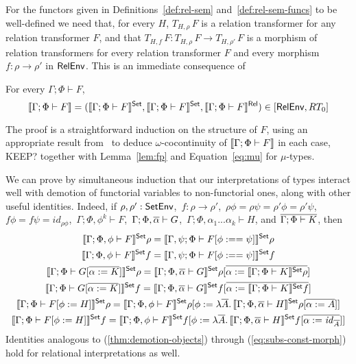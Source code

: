\documentclass{lmcs}
\theoremstyle{plain}\newtheorem{satz}[thm]{Satz}
\renewcommand{\id}{\mathit{id}}
\begin{document}
For the functors given in Definitions~\ref{def:rel-sem}
and~\ref{def:rel-sem-funcs} to be well-defined we need that, for every
$H$, $T_{H,\rho}\,F$ is a relation transformer for any relation
transformer $F$, and that $T_{H,f}\, F : T_{H,\rho}\, F \to
T_{H,\rho'}\, F$ is a morphism of relation transformers for every
relation transformer $F$ and every morphism $f : \rho \to \rho'$ in
$\mathsf{RelEnv}$. This is an immediate consequence of
\begin{lem}\label{lem:rel-transf-morph}
For every $\Gamma;\Phi \vdash F$,
\[\llbracket{\Gamma;\Phi \vdash F}\rrbracket = (\llbracket{\Gamma;\Phi \vdash F}\rrbracket^{\mathsf{Set}},
\llbracket{\Gamma;\Phi \vdash F}\rrbracket^{\mathsf{Set}},\llbracket{\Gamma;\Phi \vdash F}\rrbracket^{\mathsf{Rel}})
\in[\mathsf{RelEnv},RT_0]\] 
\end{lem}
\noindent
The proof is a straightforward induction on the structure of $F$,
using an appropriate result from~\cite{jp19} to deduce
$\omega$-cocontinuity of $\llbracket{\Gamma;\Phi \vdash F}\rrbracket$ in each case,
{\color{red} KEEP? together with Lemma~\ref{lem:fp} and
  Equation~\ref{eq:mu} for $\mu$-types.}

We can prove by simultaneous induction that our interpretations of
types interact well with demotion of functorial variables to
non-functorial ones, along with other useful identities. Indeed, if
$\rho, \rho' : \mathsf{SetEnv}$, \,$f : \rho \to \rho'$, \,$\rho \phi = \rho
\psi = \rho' \phi = \rho' \psi$, \, $f \phi = f \psi = \id_{\rho
  \phi}$,\, $\Gamma; \Phi, \phi^k \vdash F$,\,
$\Gamma;\Phi,\overline{\alpha} \vdash G$,\, $\Gamma;\Phi,\alpha_1...\alpha_k
\vdash H$, and $\overline{\Gamma;\Phi \vdash K}$, then
\begin{gather}
\label{thm:demotion-objects}
\setsem{\Gamma; \Phi, \phi \vdash F} \rho = \setsem{\Gamma, \psi; \Phi
  \vdash F[\phi :== \psi] } \rho\\
\label{thm:demotion-morphisms}
\setsem{\Gamma; \Phi, \phi \vdash F} f = \setsem{\Gamma, \psi; \Phi
  \vdash F[\phi :== \psi]} f\\
\label{eq:subs-var}
\setsem{\Gamma;\Phi \vdash G[\ol{\alpha := K}]}\rho =
\setsem{\Gamma;\Phi,\ol{\alpha} \vdash G}\rho[\ol{\alpha := 
\setsem{\Gamma;\Phi \vdash K}\rho}]\\
\label{eq:subs-var-morph}
\setsem{\Gamma;\Phi \vdash G[\ol{\alpha := K}]}f =
\setsem{\Gamma;\Phi,\ol{\alpha} \vdash G}f[\ol{\alpha :=
\setsem{\Gamma;\Phi \vdash K}f}]\\
\label{eq:subs-const}
\setsem{\Gamma; \Phi \vdash F[\phi := H]}\rho
= \setsem{\Gamma; \Phi, \phi \vdash F}\rho
[\phi := \lambda \ol{A}.\, \setsem{\Gamma;\Phi,\overline{\alpha}\vdash
    H}\rho[\overline{\alpha := A}]] \\ 
\label{eq:subs-const-morph}
\setsem{\Gamma; \Phi \vdash F[\phi := H]}f
= \setsem{\Gamma; \Phi, \phi \vdash F}f
[\phi := \lambda \ol{A}.\,\setsem{\Gamma;\Phi,\overline{\alpha}\vdash
    H}f[\overline{\alpha := \id_{\ol{A}}}]] 
\end{gather}
Identities analogous to (\ref{thm:demotion-objects}) through
(\ref{eq:subs-const-morph}) hold for relational interpretations as well.
\end{document}
